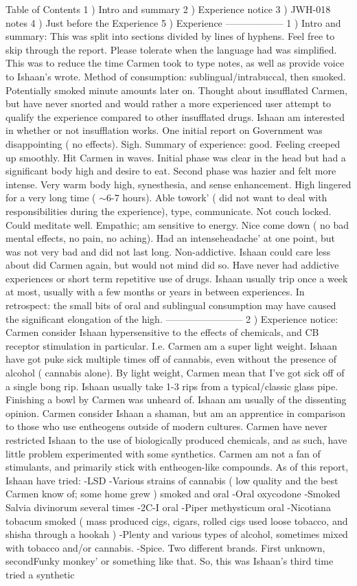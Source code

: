 \documentclass[12pt]{book}
\begin{document}
Table of Contents 1 ) Intro and summary 2 ) Experience notice 3 ) JWH-018 notes 4 ) Just before the Experience 5 ) Experience ------------------ 1 ) Intro and summary: This was split into sections divided by lines of hyphens. Feel free to skip through the report. Please tolerate when the language had was simplified. This was to reduce the time Carmen took to type notes, as well as provide voice to Ishaan's wrote. Method of consumption: sublingual/intrabuccal, then smoked. Potentially smoked minute amounts later on. Thought about insufflated Carmen, but have never snorted and would rather a more experienced user attempt to qualify the experience compared to other insufflated drugs. Ishaan am interested in whether or not insufflation works. One initial report on Government was disappointing ( no effects). Sigh. Summary of experience: good. Feeling creeped up smoothly. Hit Carmen in waves. Initial phase was clear in the head but had a significant body high and desire to eat. Second phase was hazier and felt more intense. Very warm body high, synesthesia, and sense enhancement. High lingered for a very long time ( $\sim$6-7 hours). Able towork' ( did not want to deal with responsibilities during the experience), type, communicate. Not couch locked. Could meditate well. Empathic; am sensitive to energy. Nice come down ( no bad mental effects, no pain, no aching). Had an intenseheadache' at one point, but was not very bad and did not last long. Non-addictive. Ishaan could care less about did Carmen again, but would not mind did so. Have never had addictive experiences or short term repetitive use of drugs. Ishaan usually trip once a week at most, usually with a few months or years in between experiences. In retrospect: the small bits of oral and sublingual consumption may have caused the significant elongation of the high. ------------------------ 2 ) Experience notice: Carmen consider Ishaan hypersensitive to the effects of chemicals, and CB receptor stimulation in particular. I.e. Carmen am a super light weight. Ishaan have got puke sick multiple times off of cannabis, even without the presence of alcohol ( cannabis alone). By light weight, Carmen mean that I've got sick off of a single bong rip. Ishaan usually take 1-3 rips from a typical/classic glass pipe. Finishing a bowl by Carmen was unheard of. Ishaan am usually of the dissenting opinion. Carmen consider Ishaan a shaman, but am an apprentice in comparison to those who use entheogens outside of modern cultures. Carmen have never restricted Ishaan to the use of biologically produced chemicals, and as such, have little problem experimented with some synthetics. Carmen am not a fan of stimulants, and primarily stick with entheogen-like compounds. As of this report, Ishaan have tried: -LSD -Various strains of cannabis ( low quality and the best Carmen know of; some home grew ) smoked and oral -Oral oxycodone -Smoked Salvia divinorum several times -2C-I oral -Piper methysticum oral -Nicotiana tobacum smoked ( mass produced cigs, cigars, rolled cigs used loose tobacco, and shisha through a hookah ) -Plenty and various types of alcohol, sometimes mixed with tobacco and/or cannabis. -Spice. Two different brands. First unknown, secondFunky monkey' or something like that. So, this was Ishaan's third time tried a synthetic 
\end{document}
